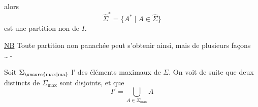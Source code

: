 alors \[ \hat{\Sigma}^{\ast}=\{A^{\ast}\mid A\in\hat{\Sigma}\} \] est une partition non  de $I$.

\uline{NB} Toute partition non panachée peut s'obtenir ainsi, mais de plusieurs façons \ldots\,-

Soit $\Sigma_{\unsure{\mathrm{max}|\mathrm{ma}}}$ l' des éléments maximaux de $\Sigma$. On voit de suite que deux  distincts de $\Sigma_{\mathrm{max}}$ sont disjoints, et que \[ I'=\bigcup_{A\in\Sigma_{\mathrm{max}}}A \]

